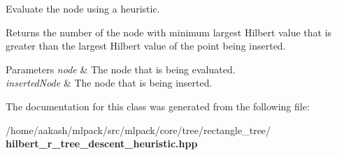 Evaluate the node using a heuristic. 

Returns the number of the node with minimum largest Hilbert value that is greater than the largest Hilbert value of the point being inserted.


\begin{DoxyParams}{Parameters}
{\em node} & The node that is being evaluated. \\
\hline
{\em inserted\+Node} & The node that is being inserted. \\
\hline
\end{DoxyParams}


The documentation for this class was generated from the following file\+:\begin{DoxyCompactItemize}
\item 
/home/aakash/mlpack/src/mlpack/core/tree/rectangle\+\_\+tree/\textbf{ hilbert\+\_\+r\+\_\+tree\+\_\+descent\+\_\+heuristic.\+hpp}\end{DoxyCompactItemize}
